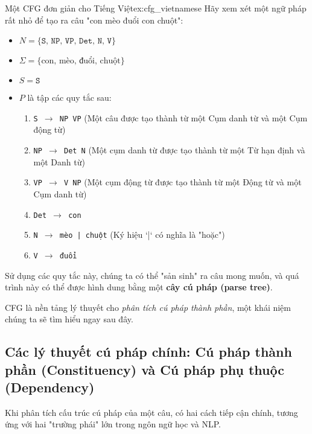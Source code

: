 \begin{example}{Một CFG đơn giản cho Tiếng Việt}{ex:cfg_vietnamese}
    Hãy xem xét một ngữ pháp rất nhỏ để tạo ra câu "con mèo đuổi con chuột":
    \begin{itemize}
        \item $N = \{ \texttt{S, NP, VP, Det, N, V} \}$
        \item $\Sigma = \{ \text{con, mèo, đuổi, chuột} \}$
        \item $S = \texttt{S}$
        \item $P$ là tập các quy tắc sau:
            \begin{enumerate}
                \item \texttt{S $\rightarrow$ NP VP} (Một câu được tạo thành từ một Cụm danh từ và một Cụm động từ)
                \item \texttt{NP $\rightarrow$ Det N} (Một cụm danh từ được tạo thành từ một Từ hạn định và một Danh từ)
                \item \texttt{VP $\rightarrow$ V NP} (Một cụm động từ được tạo thành từ một Động từ và một Cụm danh từ)
                \item \texttt{Det $\rightarrow$ con}
                \item \texttt{N $\rightarrow$ mèo | chuột} (Ký hiệu `|` có nghĩa là "hoặc")
                \item \texttt{V $\rightarrow$ đuổi}
            \end{enumerate}
    \end{itemize}
    Sử dụng các quy tắc này, chúng ta có thể "sản sinh" ra câu mong muốn, và quá trình này có thể được hình dung bằng một \textbf{cây cú pháp (parse tree)}.
\end{example}

CFG là nền tảng lý thuyết cho \textit{phân tích cú pháp thành phần}, một khái niệm chúng ta sẽ tìm hiểu ngay sau đây.

\subsection{Các lý thuyết cú pháp chính: Cú pháp thành phần (Constituency) và Cú pháp phụ thuộc (Dependency)}
\label{ssec:constituency_dependency}

Khi phân tích cấu trúc cú pháp của một câu, có hai cách tiếp cận chính, tương ứng với hai "trường phái" lớn trong ngôn ngữ học và NLP.


